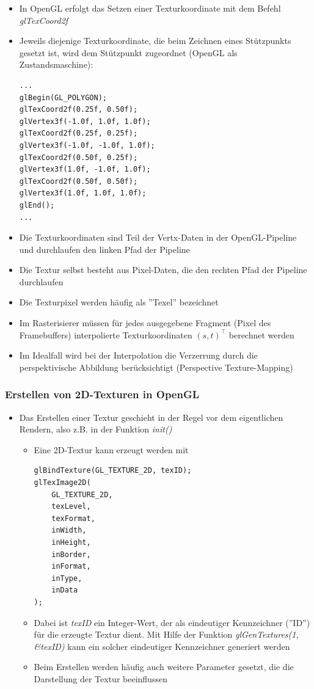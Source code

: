 \documentclass{scrartcl}
\begin{document}
\begin{itemize}
	\item In OpenGL erfolgt das Setzen einer Texturkoordinate mit dem Befehl \textit{glTexCoord2f}
	\item Jeweils diejenige Texturkoordinate, die beim Zeichnen eines Stützpunkts gesetzt ist, wird dem Stützpunkt zugeordnet (OpenGL als Zustandsmaschine):
	\begin{lstlisting}
...
glBegin(GL_POLYGON);
glTexCoord2f(0.25f, 0.50f);
glVertex3f(-1.0f, 1.0f, 1.0f);
glTexCoord2f(0.25f, 0.25f);
glVertex3f(-1.0f, -1.0f, 1.0f);
glTexCoord2f(0.50f, 0.25f);
glVertex3f(1.0f, -1.0f, 1.0f);
glTexCoord2f(0.50f, 0.50f);
glVertex3f(1.0f, 1.0f, 1.0f);
glEnd();
...
	\end{lstlisting}
	\item Die Texturkoordinaten sind Teil der Vertx-Daten in der OpenGL-Pipeline und durchlaufen den linken Pfad der Pipeline
	\item Die Textur selbst besteht aus Pixel-Daten, die den rechten Pfad der Pipeline durchlaufen
	\item Die Texturpixel werden häufig als ''Texel'' bezeichnet
	\item Im Rasterisierer müssen für jedes ausgegebene Fragment (Pixel des Framebuffers) interpolierte Texturkoordinaten $(s,t)^\top$ berechnet werden
	\item Im Idealfall wird bei der Interpolation die Verzerrung durch die perspektivische Abbildung berücksichtigt (Perspective Texture-Mapping)
\end{itemize}

\subsubsection{Erstellen von 2D-Texturen in OpenGL}

\begin{itemize}
	\item Das Erstellen einer Textur geschieht in der Regel vor dem eigentlichen Rendern, also z.B. in der Funktion \textit{init()}
	\begin{itemize}
		\item Eine 2D-Textur kann erzeugt werden mit
		\begin{lstlisting}
glBindTexture(GL_TEXTURE_2D, texID);
glTexImage2D(
	GL_TEXTURE_2D,
	texLevel,
	texFormat,
	inWidth,
	inHeight,
	inBorder,
	inFormat,
	inType,
	inData
);
		\end{lstlisting}
		\item Dabei ist \textit{texID} ein Integer-Wert, der als eindeutiger Kennzeichner (''ID'') für die erzeugte Textur dient. Mit Hilfe der Funktion \textit{glGenTextures(1, \&texID)} kann ein solcher eindeutiger Kennzeichner generiert werden
		\item Beim Erstellen werden häufig auch weitere Parameter gesetzt, die die Darstellung der Textur beeinflussen
	\end{itemize}
\end{itemize}
\end{document}
